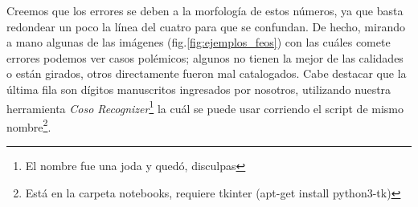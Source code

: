 Creemos que los errores se deben a la morfología de estos números, ya que basta redondear un poco la línea del cuatro para que se confundan. De hecho, mirando a mano algunas de las imágenes (fig.\ref{fig:ejemplos_feos}) con las cuáles comete errores podemos ver casos polémicos; algunos no tienen la mejor de las calidades o están girados, otros directamente fueron mal catalogados. Cabe destacar que la última fila son dígitos manuscritos ingresados por nosotros, utilizando nuestra herramienta \textit{Coso Recognizer}\footnote{El nombre fue una joda y quedó, disculpas} la cuál se puede usar corriendo el script de mismo nombre\footnote{Está en la carpeta notebooks, requiere tkinter (apt-get install python3-tk)}.
\begin{figure}[h]
    \centering
    

\end{figure}
